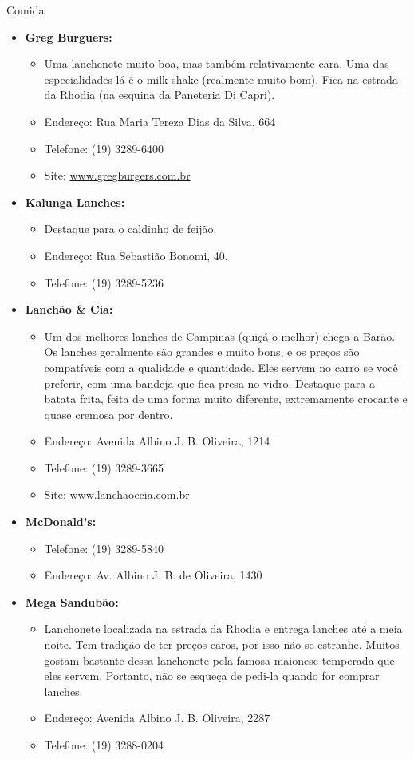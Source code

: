 \begin{story}{Comida}
\begin{itemize}
\item \textbf{Greg Burguers:}
\begin{itemize}
\item Uma lanchenete muito boa, mas também relativamente cara. Uma das especialidades lá é o milk-shake (realmente muito bom). Fica na estrada da Rhodia (na esquina da Paneteria Di Capri).
\item Endereço: Rua Maria Tereza Dias da Silva, 664
\item Telefone: (19) 3289-6400
\item Site: \url{www.gregburgers.com.br}
\end{itemize}

\item \textbf{Kalunga Lanches:}
\begin{itemize}
\item Destaque para o caldinho de feijão. 
\item Endereço: Rua Sebastião Bonomi, 40. 
\item Telefone: (19) 3289-5236
\end{itemize}

\item \textbf{Lanchão \& Cia:}
\begin{itemize}
\item Um dos melhores lanches de Campinas (quiçá o melhor) chega a Barão. Os lanches geralmente são grandes e muito bons, e os preços são compatíveis com a qualidade e quantidade. Eles servem no carro se você preferir, com uma bandeja que fica presa no vidro. Destaque para a batata frita, feita de uma forma muito diferente, extremamente crocante e quase cremosa por dentro.
\item Endereço: Avenida Albino J. B. Oliveira, 1214
\item Telefone: (19) 3289-3665
\item Site: \url{www.lanchaoecia.com.br}
\end{itemize}

\item \textbf{McDonald's:}
\begin{itemize}
\item Telefone: (19) 3289-5840
\item Endereço: Av. Albino J. B. de Oliveira, 1430
\end{itemize}

\item \textbf{Mega Sandubão:}
\begin{itemize}
\item Lanchonete localizada na estrada da Rhodia e entrega lanches até a meia noite. Tem tradição de ter preços caros, por isso não se estranhe. Muitos gostam bastante dessa lanchonete pela famosa maionese temperada que eles servem. Portanto, não se esqueça de pedi-la quando for comprar lanches.
\item Endereço: Avenida Albino J. B. Oliveira, 2287
\item Telefone: (19) 3288-0204
\end{itemize}


\end{itemize}
\end{story}
